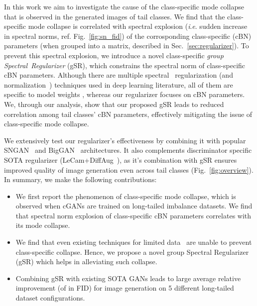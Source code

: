 \documentclass[runningheads,table]{llncs}
\newcommand{\ie}{\textit{i}.\textit{e}. }
\begin{document}
In this work we aim to investigate the cause of the class-specific mode collapse that is observed in the generated images of tail classes. We find that the class-specific mode collapse is correlated with spectral explosion (\ie sudden increase in spectral norms, ref. Fig.~\ref{fig:sn_fid}) of the corrosponding class-specific (cBN) parameters (when grouped into a matrix, described in Sec.~\ref{sec:regularizer}). To prevent this spectral explosion, we introduce a novel class-specific \textit{group \mbox{Spectral Regularizer}} (gSR), which constrains the spectral norm of class-specific cBN parameters. Although there are multiple spectral~\cite{yoshida2017spectral, vahdat2020NVAE} regularization (and normalization~\cite{miyato2018spectral}) techniques used in deep learning literature, all of them are specific to model weights , whereas our regularizer focuses on cBN parameters. We, through our analysis, show that our proposed gSR leads to reduced correlation among tail classes' cBN parameters, effectively mitigating the issue of class-specific mode collapse. 

We extensively test our regularizer's effectiveness by combining it with popular SNGAN~\cite{miyato2018spectral} and BigGAN~\cite{brock2018large} architectures. It also complements discriminator specific SOTA regularizer (LeCam+DiffAug~\cite{tseng2021regularizing}), as it's combination with gSR ensures improved quality of image generation even across tail classes (Fig.~\ref{fig:overview}). In summary, we make the following contributions:
\begin{itemize}
\itemsep0em 
    \item We first report the phenomenon of class-specific mode collapse, which is observed when cGANs are trained on long-tailed imbalance datasets. We find that spectral norm explosion of class-specific cBN parameters correlates with its mode collapse.
    \item We find that even existing techniques for limited data~\cite{tseng2021regularizing, liu2021generative, Karras2020ada} are unable to prevent class-specific collapse. Hence, we propose a novel group Spectral Regularizer (gSR) which helps in alleviating such collapse.
    \item   Combining gSR with existing SOTA GANs leads to large average relative improvement (of  in FID) for image generation on 5 different long-tailed dataset configurations.
\end{itemize}
\end{document}
